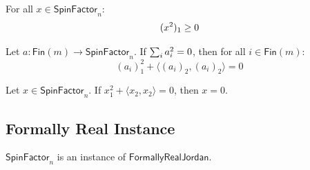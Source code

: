 \begin{theorem}
For all $x \in \mathsf{SpinFactor}_n$:
\[ (x^{2})_1 \ge 0 \]
\end{theorem}

\begin{theorem}
Let $a : \mathsf{Fin}(m) \to \mathsf{SpinFactor}_n$. If $\sum_{i} a_i^{2} = 0$, then for all $i \in \mathsf{Fin}(m)$:
\[ (a_i)_1^2 + \langle (a_i)_2, (a_i)_2 \rangle = 0 \]
\end{theorem}

\begin{theorem}
Let $x \in \mathsf{SpinFactor}_n$. If $x_1^2 + \langle x_2, x_2 \rangle = 0$, then $x = 0$.
\end{theorem}

\subsection{Formally Real Instance}

\begin{proposition}[formallyReal]
$\mathsf{SpinFactor}_n$ is an instance of $\mathsf{FormallyRealJordan}$.
\end{proposition}
